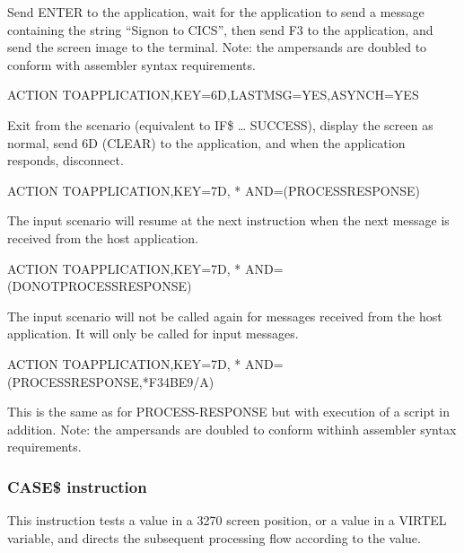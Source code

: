 \documentclass[letterpaper,10pt,english]{sphinxmanual}
\begin{document}
Send ENTER to the application, wait for the application to send a message containing the string “Signon to CICS”, then send F3 to the application, and send the screen image to the terminal. Note: the ampersands are doubled to conform with assembler syntax requirements.

\begin{sphinxVerbatim}[commandchars=\\\{\}]
ACTION\PYGZdl{} TO\PYGZhy{}APPLICATION,KEY=6D,LASTMSG=YES,ASYNCH=YES
\end{sphinxVerbatim}

Exit from the scenario (equivalent to IF\$ … SUCCESS), display the screen as normal, send 6D (CLEAR) to the application, and when the application responds, disconnect.

\begin{sphinxVerbatim}[commandchars=\\\{\}]
ACTION\PYGZdl{} TO\PYGZhy{}APPLICATION,KEY=7D, *
AND=(PROCESS\PYGZhy{}RESPONSE)
\end{sphinxVerbatim}

The input scenario will resume at the next instruction when the next message is received from the host application.

\begin{sphinxVerbatim}[commandchars=\\\{\}]
ACTION\PYGZdl{} TO\PYGZhy{}APPLICATION,KEY=7D, *
AND=(DO\PYGZhy{}NOT\PYGZhy{}PROCESS\PYGZhy{}RESPONSE)
\end{sphinxVerbatim}

The input scenario will not be called again for messages received from the host application. It will only be called for
input messages.

\begin{sphinxVerbatim}[commandchars=\\\{\}]
ACTION\PYGZdl{} TO\PYGZhy{}APPLICATION,KEY=7D, *
AND=(PROCESS\PYGZhy{}RESPONSE,\PYGZsq{}\PYGZam{}\PYGZam{}*F34BE9\PYGZam{}\PYGZam{}/A\PYGZsq{})
\end{sphinxVerbatim}

This is the same as for PROCESS-RESPONSE but with execution of a script in addition. Note: the ampersands are
doubled to conform withinh assembler syntax requirements.


\subsubsection{CASE\$ instruction}
\label{\detokenize{User_Guide:case-instruction}}
This instruction tests a value in a 3270 screen position, or a value in a VIRTEL variable, and directs the subsequent
processing flow according to the value.
\end{document}
